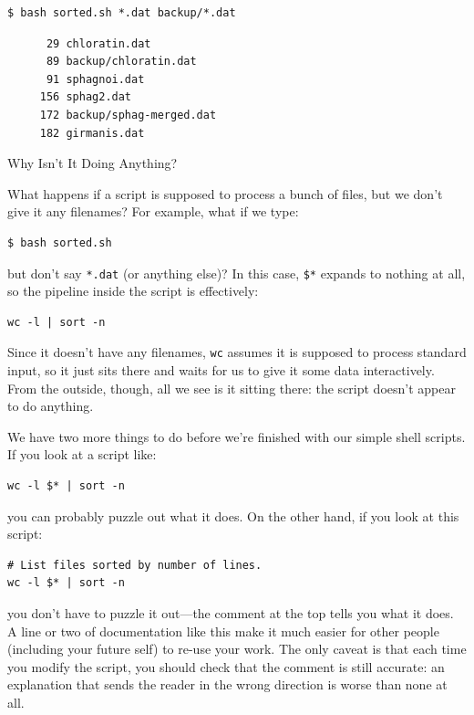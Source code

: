 \documentclass{book}
\begin{document}
\begin{verbatim}
$ bash sorted.sh *.dat backup/*.dat
\end{verbatim}

\begin{verbatim}
      29 chloratin.dat
      89 backup/chloratin.dat
      91 sphagnoi.dat
     156 sphag2.dat
     172 backup/sphag-merged.dat
     182 girmanis.dat
\end{verbatim}

\begin{swcbox}{Why Isn't It Doing Anything?}

What happens if a script is supposed to process a bunch of files, but we
don't give it any filenames? For example, what if we type:

\begin{verbatim}
$ bash sorted.sh
\end{verbatim}

but don't say \texttt{*.dat} (or anything else)? In this case,
\texttt{\$*} expands to nothing at all, so the pipeline inside the
script is effectively:

\begin{verbatim}
wc -l | sort -n
\end{verbatim}

Since it doesn't have any filenames, \texttt{wc} assumes it is supposed
to process standard input, so it just sits there and waits for us to
give it some data interactively. From the outside, though, all we see is
it sitting there: the script doesn't appear to do anything.

\end{swcbox}

We have two more things to do before we're finished with our simple
shell scripts. If you look at a script like:

\begin{verbatim}
wc -l $* | sort -n
\end{verbatim}

you can probably puzzle out what it does. On the other hand, if you look
at this script:

\begin{verbatim}
# List files sorted by number of lines.
wc -l $* | sort -n
\end{verbatim}

you don't have to puzzle it out---the comment at the top tells you what
it does. A line or two of documentation like this make it much easier
for other people (including your future self) to re-use your work. The
only caveat is that each time you modify the script, you should check
that the comment is still accurate: an explanation that sends the reader
in the wrong direction is worse than none at all.
\end{document}
